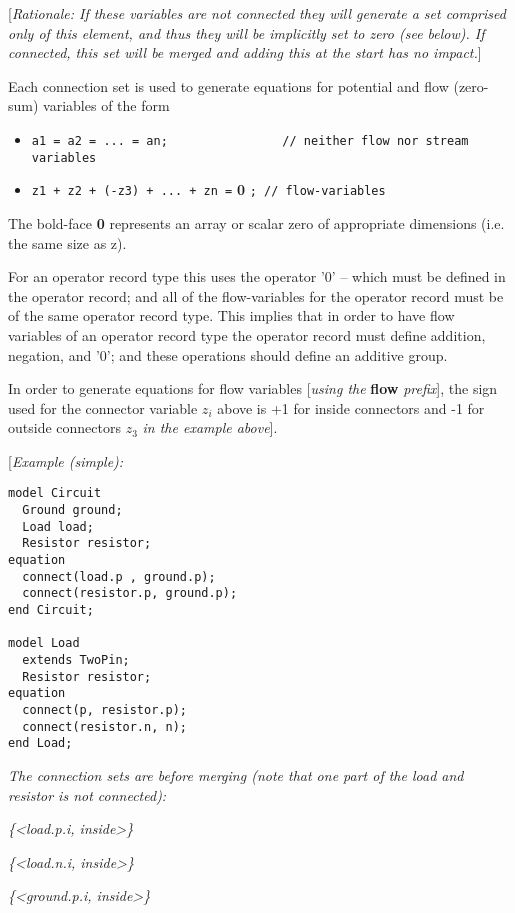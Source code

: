 {[}\emph{Rationale: If these variables are not connected they will
generate a set comprised only of this element, and thus they will be
implicitly set to zero (see below). If connected, this set will be
merged and adding this at the start has no impact.}{]}

Each connection set is used to generate equations for potential and flow
(zero-sum) variables of the form

\begin{itemize}
\item
\lstinline!a1 = a2 = ... = an;                // neither flow nor stream variables!
\item
\lstinline!z1 + z2 + (-z3) + ... + zn =! \small{\textbf{0}} \lstinline!; // flow-variables!
\end{itemize}

The bold-face \textbf{0} represents an array or scalar zero of
appropriate dimensions (i.e. the same size as z).

For an operator record type this uses the operator '0' -- which must be
defined in the operator record; and all of the flow-variables for the
operator record must be of the same operator record type. This implies
that in order to have flow variables of an operator record type the
operator record must define addition, negation, and '0'; and these
operations should define an additive group.

In order to generate equations for flow variables {[}\emph{using the}
\textbf{flow} \emph{prefix}{]}, the sign used for the connector variable
$z_i$ above is +1 for inside connectors and -1 for outside
connectors $z_3$ \emph{in the example above}{]}.

{[}\emph{Example (simple):}

\begin{lstlisting}[language=modelica]
model Circuit
  Ground ground;
  Load load;
  Resistor resistor;
equation
  connect(load.p , ground.p);
  connect(resistor.p, ground.p);
end Circuit;

model Load
  extends TwoPin;
  Resistor resistor;
equation
  connect(p, resistor.p);
  connect(resistor.n, n);
end Load;
\end{lstlisting}
\emph{The connection sets are before merging (note that one part of the
load and resistor is not connected):}

\emph{\{\textless{}load.p.i, inside\textgreater{}\}}

\emph{\{\textless{}load.n.i, inside\textgreater{}\}}

\emph{\{\textless{}ground.p.i, inside\textgreater{}\}}


